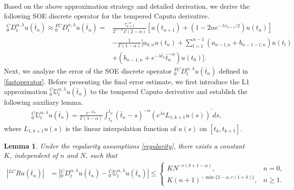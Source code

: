 \documentclass[10pt, reqno]{amsart}
\newtheorem{lmm}{\bf Lemma}
\newenvironment{lemma}{\begin{lmm}}{\end{lmm}}
\theoremstyle{remark}
\theoremstyle{definition}
\numberwithin{table}{section}
\begin{document}
Based on the above approximation strategy and detailed derivation, we derive the following SOE discrete operator for the tempered Caputo derivative.
\begin{equation} \label{fastoperator}
\begin{aligned}
{ }_0^C D_t^{\alpha,  \lambda} u(\bar{t}_n)\approx{ }_0^{FC}D_t^{\alpha,  \lambda} u(\bar{t}_n) =  &\frac{\tau_{n+1}^{-\alpha}}{2^{1-\alpha}\Gamma(2-\alpha)}[u(t_{n+1})+(1-2\alpha e^{-\lambda \tau_{n+1}/2})u(t_{n})] \\
    & -\frac{1}{\Gamma(1-\alpha)}[a_{0, n}u(t_n)+\sum_{l=1}^{n-1}(a_{n-l, n}+b_{n-1-l, n})u(t_l)\\
    &+(b_{n-1, n}+e^{-\lambda \bar{t}_n}\bar{t}_n^{-\alpha})u(t_0)].
\end{aligned}
\end{equation}
Next, we analyze the error of the SOE discrete operator ${}_0^{FC}D_t^{\alpha,\lambda} u(\bar{t}_n)$ defined in \eqref{fastoperator}. Before presenting the final error estimate, we first introduce the L1 approximation ${}_0^C\mathbb{D}_t^{\alpha, \lambda} u(\bar{t}_n)$ \cite{cao2020,Liao2018,stynes2017} to the tempered Caputo derivative and establish the following auxiliary lemma.
\begin{align}
    _0^C\mathbb{D}_t^{\alpha, \lambda} u(\bar{t}_n)=\frac{e^{-\lambda \bar{t}_n}}{\Gamma(1-\alpha)}\int_{t_k}^{\bar{t}_n}(\bar{t}_n-s)^{-\alpha}(e^{\lambda s}L_{1, k+1}u(s))^{\prime}ds,\label{L1operator}
\end{align}
where $L_{1, k+1}u(s)$ is the linear interpolation function of $u(s)$ on $[t_k, t_{k+1}]$.
\begin{lemma}\label{Ru}
Under the regularity assumptions \eqref{regularity}, there exists a constant $K$, independent of $n$ and $N$, such that
    \begin{align}
        | {}^{LC}Ru(\bar{t}_n)|&= |{}^C_0 D^{\alpha, \lambda}_t u(\bar{t}_n)- {}^C_0\mathbb{D}_t^{\alpha,  \lambda} u(\bar{t}_n)|\leq 
        \begin{cases} 
        KN^{-r(\delta+1-\alpha)},&n=0,\\
        K(n+1)^{-\min\{2-\alpha, r(1+\delta)\}}, &n\geq 1.
        \end{cases}\label{L1half}
\end{align}
\end{lemma}
\end{document}
